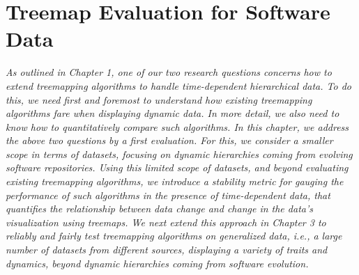 \chapter{Treemap Evaluation for Software Data}
\label{ch:soft-eval}

\textit{
As outlined in Chapter 1, one of our two research questions concerns how to extend treemapping algorithms to handle time-dependent hierarchical data. To do this, we need first and foremost to understand how existing treemapping algorithms fare when displaying dynamic data. In more detail, we also need to know how to quantitatively compare such algorithms. In this chapter, we address the above two questions by a first evaluation. For this, we consider a smaller scope in terms of datasets, focusing on dynamic hierarchies coming from evolving software repositories. Using this limited scope of datasets, and beyond evaluating existing treemapping algorithms, we introduce a stability metric for gauging the performance of such algorithms in the presence of time-dependent data, that quantifies the relationship between data change and change in the data's visualization using treemaps. We next extend this approach in Chapter 3 to reliably and fairly test treemapping algorithms on generalized data, \emph{i.e.}, a large number of datasets from different sources, displaying a variety of traits and dynamics, beyond dynamic hierarchies coming from software evolution.}


\vspace{5mm} %

